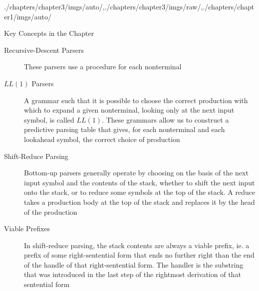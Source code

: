 \begin{graphicspathcontext}{{./chapters/chapter3/imgs/auto/},{./chapters/chapter3/imgs/raw/},{./chapters/chapter1/imgs/auto/}}
\begin{bibunit}[apalike]
\begin{frame}{{Key Concepts} in the Chapter \insertcontinuationtext}
\begin{small}
\begin{description}
	\item[Recursive-Descent Parsers] These parsers use a procedure for each nonterminal
	\item[$LL(1)$ Parsers] A grammar such that it is possible to choose the correct production with which to expand a given nonterminal, looking only at the next input symbol, is called $LL(1)$. These grammars allow us to construct a predictive parsing table that gives, for each nonterminal and each lookahead symbol, the correct choice of production
	\item[Shift-Reduce Parsing] Bottom-up parsers generally operate by choosing on the basis of the next input symbol and the contents of the stack, whether to shift the next input onto the stack, or to reduce some symbols at the top of the stack. A reduce takes a production body at the top of the stack and replaces it by the head of the production
	\item[Viable Prefixes] In shift-reduce parsing, the stack contents are always a viable prefix, ie. a prefix of some right-sentential form that ends no further right than the end of the handle of that right-sentential form. The handler is the substring that was introduced in the last step of the rightmost derivation of that sentential form
	\end{description}
\end{small}
\end{frame}


\end{bibunit}
\end{graphicspathcontext}
